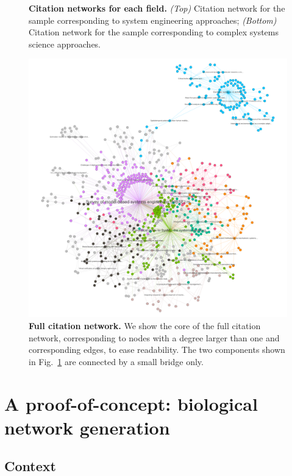 \documentclass[runningheads,a4paper]{llncs2e/llncs}
\begin{document}
\begin{figure}
	\caption{\textbf{Citation networks for each field.} \textit{(Top)} Citation network for the sample corresponding to system engineering approaches; \textit{(Bottom)} Citation network for the sample corresponding to complex systems science approaches.\label{fig:bothcitnw}}
\end{figure}


\begin{figure}
	\includegraphics[width=\linewidth]{figures/core.png}
	\caption{\textbf{Full citation network.} We show the core of the full citation network, corresponding to nodes with a degree larger than one and corresponding edges, to ease readability. The two components shown in Fig.~\ref{fig:bothcitnw} are connected by a small bridge only.\label{fig:citnw}}
\end{figure}





\section{A proof-of-concept: biological network generation}


\subsection{Context}
\end{document}
